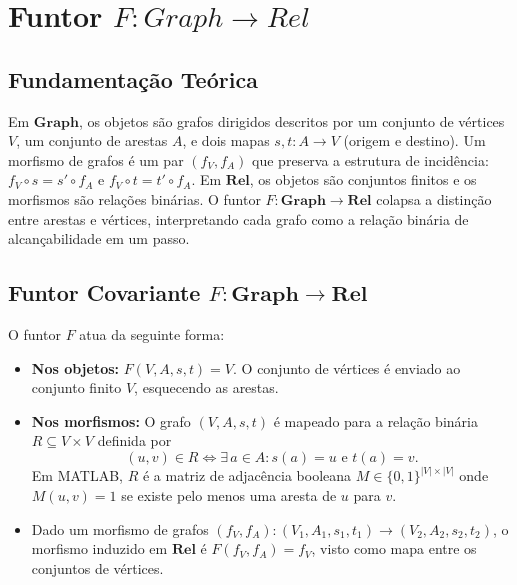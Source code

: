 \section{Funtor $F: Graph \to Rel$}
\label{sec:functor-graph-rel}

\subsection{Fundamentação Teórica}

Em $\mathbf{Graph}$, os objetos são grafos dirigidos descritos por um conjunto de vértices $V$, um conjunto de arestas $A$, e dois mapas $s, t: A \to V$ (origem e destino). Um morfismo de grafos é um par $(f_V, f_A)$ que preserva a estrutura de incidência: $f_V \circ s = s' \circ f_A$ e $f_V \circ t = t' \circ f_A$. Em $\mathbf{Rel}$, os objetos são conjuntos finitos e os morfismos são relações binárias. O funtor $F: \mathbf{Graph} \to \mathbf{Rel}$ colapsa a distinção entre arestas e vértices, interpretando cada grafo como a relação binária de alcançabilidade em um passo.

\subsection{Funtor Covariante $F: \mathbf{Graph} \to \mathbf{Rel}$}

\begin{definition}
O funtor $F$ atua da seguinte forma:
\begin{itemize}
    \item \textbf{Nos objetos:} $F(V, A, s, t) = V$. O conjunto de vértices é enviado ao conjunto finito $V$, esquecendo as arestas.
    \item \textbf{Nos morfismos:} O grafo $(V, A, s, t)$ é mapeado para a relação binária $R \subseteq V \times V$ definida por
    \[
        (u, v) \in R \iff \exists\, a \in A : s(a) = u \text{ e } t(a) = v.
    \]
    Em MATLAB, $R$ é a matriz de adjacência booleana $M \in \{0,1\}^{|V| \times |V|}$ onde $M(u, v) = 1$ se existe pelo menos uma aresta de $u$ para $v$.
    \item Dado um morfismo de grafos $(f_V, f_A): (V_1, A_1, s_1, t_1) \to (V_2, A_2, s_2, t_2)$, o morfismo induzido em $\mathbf{Rel}$ é $F(f_V, f_A) = f_V$, visto como mapa entre os conjuntos de vértices.
\end{itemize}
\end{definition}

